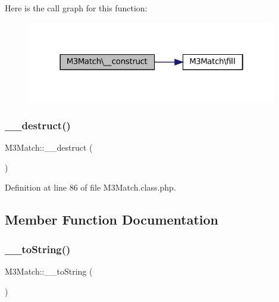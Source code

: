 Here is the call graph for this function\+:\nopagebreak
\begin{figure}[H]
\begin{center}
\leavevmode
\includegraphics[width=310pt]{class_m3_match_a06f9baa07b235b5607b2376c2ef7726b_cgraph}
\end{center}
\end{figure}
\mbox{\label{class_m3_match_a993e96aa98947a76c944aa112667673d}} 
\subsubsection{\texorpdfstring{\+\_\+\+\_\+destruct()}{\_\_destruct()}}
{\footnotesize\ttfamily M3\+Match\+::\+\_\+\+\_\+destruct (\begin{DoxyParamCaption}{ }\end{DoxyParamCaption})}



Definition at line 86 of file M3\+Match.\+class.\+php.



\subsection{Member Function Documentation}
\mbox{\label{class_m3_match_a078e2fcc74c49a28d149b3659363dc78}} 
\subsubsection{\texorpdfstring{\+\_\+\+\_\+to\+String()}{\_\_toString()}}
{\footnotesize\ttfamily M3\+Match\+::\+\_\+\+\_\+to\+String (\begin{DoxyParamCaption}{ }\end{DoxyParamCaption})}



